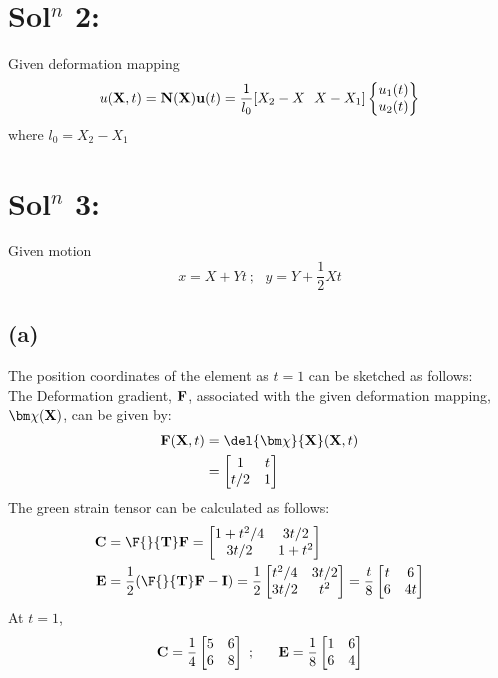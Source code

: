 \section*{Sol$^n$ 2:}
Given deformation mapping
\begin{align*}
u({\bf X},t)
=
{\bf N}({\bf X}){\bf u}(t)
=
\frac{1}{l_0}
[X_2 - X\ \ X-X_1]
\begin{Bmatrix}
u_1(t)\\u_2(t)
\end{Bmatrix}
\end{align*}
where $l_0 = X_2 - X_1$
\section*{Sol$^n$ 3: }
Given motion 
\[
x = X + Yt\ ; \ \ \ y = Y + \frac{1}{2}Xt
\]
\subsection*{(a)}
The position coordinates of the element as $t=1$ can be sketched as follows: \\
The Deformation gradient, $\bf F$, associated with the given deformation mapping, $\bm\chi({\bf X})$, can be given by:
\begin{align*}
{\bf F} ({\bf X},t)
& = \del{\bm\chi}{\bf X}({\bf X}, t)\\
& = \begin{bmatrix}
1 & t\\
t/2 & 1
\end{bmatrix}
\end{align*}
The green strain tensor can be calculated as follows:
\begin{align*}
{\bf C} 
& = {\bf \F{}{T} F} = \begin{bmatrix}
1+t^2/4 & 3t/2\\
3t/2 & 1+t^2
\end{bmatrix}\\
{\bf E}
& =
\frac{1}{2}
({\bf \F{}{T} F - I})
=
\frac{1}{2}
\begin{bmatrix}
t^2/4 & 3t/2\\
3t/2 & t^2
\end{bmatrix}
=
\frac{t}{8}
\begin{bmatrix}
t & 6\\
6 & 4t
\end{bmatrix}
\end{align*}
At $t=1$, 
\begin{align*}
{\bf C}
=
\frac{1}{4}
\begin{bmatrix}
5 & 6\\
6 & 8
\end{bmatrix}\ ;\ \ \ \ \ {\bf E} = \frac{1}{8}\begin{bmatrix}
1 & 6\\
6 & 4
\end{bmatrix}
\end{align*}
